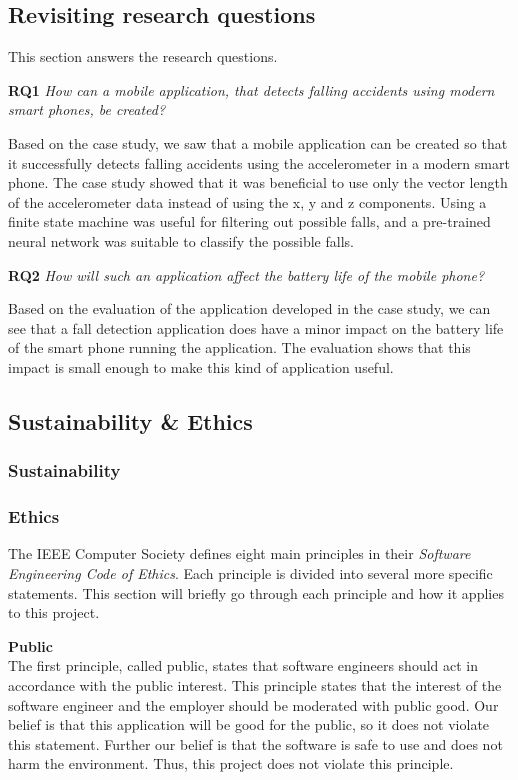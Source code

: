 \documentclass[12pt, a4paper, onecolumn]{article}
\newcommand{\parag}[1]{
	\textbf{#1} \hspace{0pt} \\
}
\begin{document}
	\subsection{Revisiting research questions}
	
	This section answers the research questions.
	
	\textbf{RQ1} \textit{How can a mobile application, that detects falling accidents using modern smart phones, be created?}
	
	Based on the case study, we saw that a mobile application can be created so that it successfully detects falling accidents using the accelerometer in a modern smart phone. The case study showed that it was beneficial to use only the vector length of the accelerometer data instead of using the x, y and z components. Using a finite state machine was useful for filtering out possible falls, and a pre-trained neural network was suitable to classify the possible falls.
	
	\textbf{RQ2} \textit{How will such an application affect the battery life of the mobile phone?}
	
	Based on the evaluation of the application developed in the case study, we can see that a fall detection application does have a minor impact on the battery life of the smart phone running the application. The evaluation shows that this impact is small enough to make this kind of application useful.
	
	\subsection{Sustainability \& Ethics}
	
	\subsubsection{Sustainability}
	
	\subsubsection{Ethics}
	
	The IEEE Computer Society defines eight main principles in their \textit{Software Engineering Code of Ethics}. Each principle is divided into several more specific statements.
	This section will briefly go through each principle and how it applies to this project.
	
	\parag{Public}
	The first principle, called public, states that software engineers should act in accordance with the public interest. This principle states that the interest of the software engineer and the employer should be moderated with public good. Our belief is that this application will be good for the public, so it does not violate this statement. Further our belief is that the software is safe to use and does not harm the environment. Thus, this project does not violate this principle.
	
\end{document}
